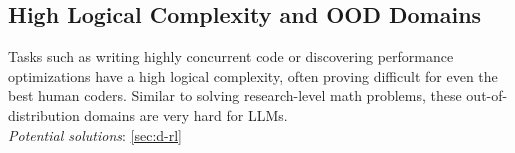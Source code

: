 






\subsection{High Logical Complexity and OOD Domains} \label{sec:c-ood-domains}

\begin{tcolorbox}[colback=lightgreen, boxrule=0pt, arc=5pt, outer arc=5pt, after skip=10pt plus 2pt]
Tasks such as writing highly concurrent code or discovering  performance optimizations have a high logical complexity, often proving difficult for even the best human coders. Similar to solving research-level math problems, these out-of-distribution domains are very hard for LLMs.
\newline \\
\textit{Potential solutions}: \ref{sec:d-rl}
\end{tcolorbox}

